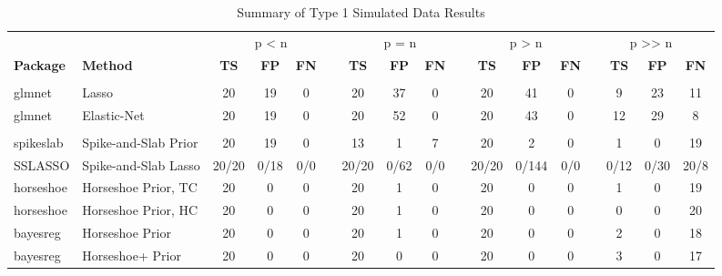 \documentclass[
  11pt,
]{article}
\begin{document}
\begin{landscape}
    
\begin{table}[H]

\caption{\label{tab:Results T1}Summary of Type 1 Simulated Data Results}
\centering
\fontsize{10}{12}\selectfont
\begin{tabular}[t]{>{}l|>{}l|>{}c|>{}c|>{}c|>{}c|>{}c|>{}c|>{}c|>{}c|>{}c|>{}c|>{}c|>{}c|>{}c|>{}c|>{}c|}
\toprule
\multicolumn{2}{c}{ } & \multicolumn{4}{c}{p < n} & \multicolumn{4}{c}{p = n} & \multicolumn{3}{c}{p > n} & \multicolumn{4}{c}{p >> n} \\
\cmidrule(l{3pt}r{3pt}){3-6} \cmidrule(l{3pt}r{3pt}){7-10} \cmidrule(l{3pt}r{3pt}){11-13} \cmidrule(l{3pt}r{3pt}){14-17}
\textbf{Package} & \textbf{Method} & \textbf{TS} & \textbf{FP} & \textbf{FN} &  & \textbf{TS} & \textbf{FP} & \textbf{FN} &  & \textbf{TS} & \textbf{FP} & \textbf{FN} &  & \textbf{TS} & \textbf{FP} & \textbf{FN}\\
\midrule
\addlinespace[0.3em]
\multicolumn{17}{l}{\textit{Frequentist Methods}}\\
\hspace{1em}glmnet & Lasso & 20 & 19 & 0 &  & 20 & 37 & 0 &  & 20 & 41 & 0 &  & 9 & 23 & 11\\
\hspace{1em}glmnet & Elastic-Net & 20 & 19 & 0 &  & 20 & 52 & 0 &  & 20 & 43 & 0 &  & 12 & 29 & 8\\
\addlinespace[0.3em]
\multicolumn{17}{l}{\textit{Bayesian Methods}}\\
\hspace{1em}spikeslab & Spike-and-Slab Prior & 20 & 19 & 0 &  & 13 & 1 & 7 &  & 20 & 2 & 0 &  & 1 & 0 & 19\\
\hspace{1em}SSLASSO & Spike-and-Slab Lasso & 20/20 & 0/18 & 0/0 &  & 20/20 & 0/62 & 0/0 &  & 20/20 & 0/144 & 0/0 &  & 0/12 & 0/30 & 20/8\\
\hspace{1em}horseshoe & Horseshoe Prior, TC & 20 & 0 & 0 &  & 20 & 1 & 0 &  & 20 & 0 & 0 &  & 1 & 0 & 19\\
\hspace{1em}horseshoe & Horseshoe Prior, HC & 20 & 0 & 0 &  & 20 & 1 & 0 &  & 20 & 0 & 0 &  & 0 & 0 & 20\\
\hspace{1em}bayesreg & Horseshoe Prior & 20 & 0 & 0 &  & 20 & 1 & 0 &  & 20 & 0 & 0 &  & 2 & 0 & 18\\
\hspace{1em}bayesreg & Horseshoe+ Prior & 20 & 0 & 0 &  & 20 & 0 & 0 &  & 20 & 0 & 0 &  & 3 & 0 & 17\\

\end{tabular}
\end{table}
\end{landscape}
\end{document}
